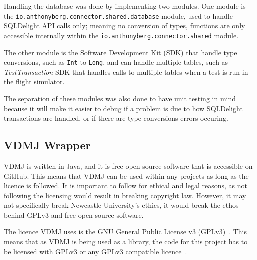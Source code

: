 \documentclass[../dissertation.tex]{subfiles}
\begin{document}
Handling the database was done by implementing two modules.
One module is the \lstinline|io.anthonyberg.connector.shared.database| module,
used to handle SQLDelight API calls only; meaning no conversion of types,
functions are only accessible internally within the \lstinline|io.anthonyberg.connector.shared|
module.

The other module is the Software Development Kit (SDK) that handle type conversions,
such as \lstinline|Int| to \lstinline|Long|, and can handle multiple tables,
such as \textit{TestTransaction} SDK that handles calls to multiple tables
when a test is run in the flight simulator.

The separation of these modules was also done to have unit testing in mind because
it will make it easier to debug if a problem is due to how SQLDelight transactions are
handled, or if there are type conversions errors occuring.


\subsection{VDMJ Wrapper}

VDMJ is written in Java, and it is free open source software that is accessible on GitHub.
This means that VDMJ can be used within any projects as long as the licence is followed.
It is important to follow for ethical and legal reasons, as not following the licensing
would result in breaking copyright law. However, it may not specifically break Newcastle
University's ethics, it would break the ethos behind GPLv3 and free open source software.

The licence VDMJ uses is the GNU General Public License v3 (GPLv3)~\cite{vdmj:license}\cite{gpl3}.
This means that as VDMJ is being used as a library, the code for this project has to be
licensed with GPLv3 or any GPLv3 compatible licence~\cite{gpl3:library}.
\end{document}
